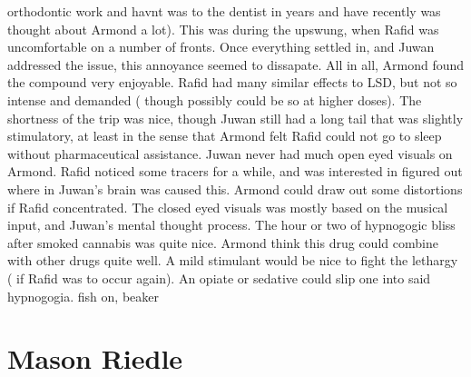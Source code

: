 \documentclass[12pt]{book}
\begin{document}
orthodontic work and havnt was to the dentist in years and have recently was thought about Armond a lot). This was during the upswung, when Rafid was uncomfortable on a number of fronts. Once everything settled in, and Juwan addressed the issue, this annoyance seemed to dissapate. All in all, Armond found the compound very enjoyable. Rafid had many similar effects to LSD, but not so intense and demanded ( though possibly could be so at higher doses). The shortness of the trip was nice, though Juwan still had a long tail that was slightly stimulatory, at least in the sense that Armond felt Rafid could not go to sleep without pharmaceutical assistance. Juwan never had much open eyed visuals on Armond. Rafid noticed some tracers for a while, and was interested in figured out where in Juwan's brain was caused this. Armond could draw out some distortions if Rafid concentrated. The closed eyed visuals was mostly based on the musical input, and Juwan's mental thought process. The hour or two of hypnogogic bliss after smoked cannabis was quite nice. Armond think this drug could combine with other drugs quite well. A mild stimulant would be nice to fight the lethargy ( if Rafid was to occur again). An opiate or sedative could slip one into said hypnogogia. fish on, beaker



\chapter{Mason Riedle}
\end{document}
